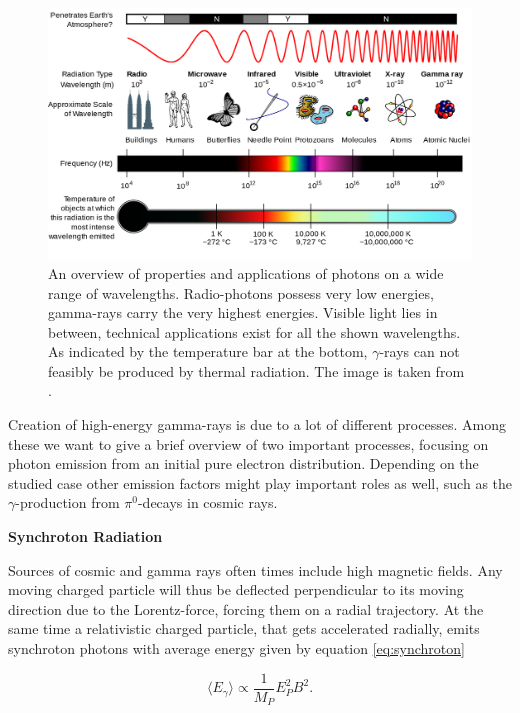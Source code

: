 \begin{figure}
	\centering
	\captionsetup{width=0.9\linewidth}
	\includegraphics[width=.9\textwidth]{images/em_spectrum.png}
	\caption{An overview of properties and applications of photons
		on a wide range of wavelengths.
		Radio-photons possess very low energies, gamma-rays 
		carry the very highest energies.
		Visible light lies in between, technical 
		applications exist for all the shown wavelengths.
		As indicated by the temperature bar at the bottom,
		$\gamma$-rays can not feasibly be produced by thermal radiation.
		The image is taken from \cite{wiki_em}.}
	\label{fig:em_spectrum}
\end{figure}

\iffalse

Creation of high-energy gamma-rays is due to a lot of 
different processes. Among these we want to give a brief 
overview of two important processes, focusing on 
photon emission from an initial pure electron distribution.
Depending on the studied case other emission factors 
might play important roles as well, such as 
the $\gamma$-production from $\pi^0$-decays in cosmic rays.

\textbf{Synchroton Radiation}

Sources of cosmic and gamma rays often times include 
high magnetic fields. Any moving charged particle will thus be
deflected perpendicular to its moving direction
due to the Lorentz-force, forcing them on a radial trajectory.
At the same time a relativistic charged particle, 
that gets accelerated radially, emits synchroton 
photons with average energy given by 
equation \ref{eq:synchroton}

\begin{equation}
	\langle E_{\gamma} \rangle \propto \frac{1}{M_P} E_P^2 B^2.
	\label{eq:synchroton}
\end{equation}

